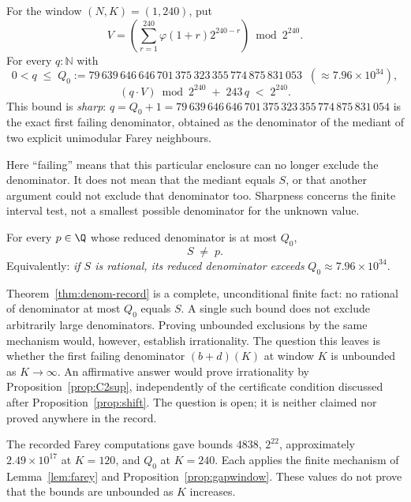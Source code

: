 \begin{prop}[The Farey certificate at $K=240$]
\label{prop:gapwindow}
For the window $(N,K)=(1,240)$, put
\[
 V=\left(\sum_{r=1}^{240}\varphi(1+r)2^{240-r}\right)\bmod2^{240}.
\]
For every $q : \mathbb{N}$ with
\[
0 < q \;\le\; Q_0 := 79\,639\,646\,646\,701\,375\,323\,355\,774\,875\,831\,053 \;\;(\approx 7.96\times 10^{34}),
\]
\[
(q \cdot V) \bmod 2^{240} \;+\; 243\,q \;<\; 2^{240}.
\]
This bound is \emph{sharp}: $q = Q_0+1 = 79\,639\,646\,646\,701\,375\,323\,355\,774\,875\,831\,054$
is the exact first failing denominator, obtained as the denominator of
the mediant of two explicit unimodular Farey neighbours.
\end{prop}
Here ``failing'' means that this particular enclosure can no longer
exclude the denominator. It does not mean that the mediant equals
$S$, or that another argument could not exclude that denominator too.
Sharpness concerns the finite interval test, not a smallest possible
denominator for the unknown value.

\begin{thm}
\label{thm:denom-record}
For every $p\in\Q$ whose reduced denominator is at most $Q_0$,
\[
S \;\neq\; p.
\]
Equivalently: \emph{if $S$ is rational, its reduced denominator exceeds}
$Q_0 \approx 7.96 \times 10^{34}$.
\end{thm}

\begin{rem}
Theorem~\ref{thm:denom-record} is a complete, unconditional finite fact: no rational
of denominator at most $Q_0$ equals $S$. A single such bound does not
exclude arbitrarily large denominators. Proving unbounded exclusions by
the same mechanism would, however, establish irrationality. The question
this leaves is whether the first failing denominator $(b+d)(K)$ at
window $K$ is unbounded as $K \to \infty$. An affirmative answer
would prove irrationality by Proposition~\ref{prop:C2sup}, independently of the
certificate condition discussed after Proposition~\ref{prop:shift}. The
question is open; it is neither claimed nor proved anywhere in the record.
\end{rem}

\begin{rem}
The recorded Farey computations gave bounds $4838$, $2^{22}$,
approximately $2.49\times10^{17}$ at $K=120$, and $Q_0$ at $K=240$.
Each applies the finite mechanism of Lemma~\ref{lem:farey} and
Proposition~\ref{prop:gapwindow}. These values do not prove that the
bounds are unbounded as $K$ increases.
\end{rem}

